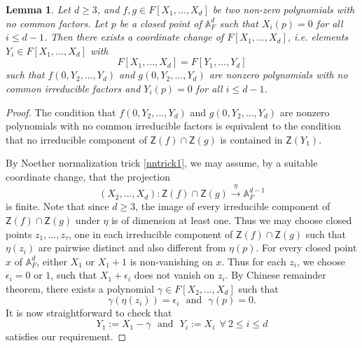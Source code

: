 \documentclass[10pt]{amsart}
\theoremstyle{plain}
\newtheorem{lemma}[thm]{Lemma}
\theoremstyle{definition}
\newcommand{\intersection}{\cap}
\newcommand{\A}{{\mathbb A}}
\let\syn\mathsf
\begin{document}
\begin{lemma}\label{fgcommon} Let $d\geq 3$, and $f,g\in F[X_1,...,X_d]$ be two non-zero polynomials with no common factors. Let $p$ be a closed point of $\A^d_F$ such that $X_i(p)=0$ for all $i\leq d-1$. Then there exists a coordinate change of $F[X_1,...,X_d]$, i.e. elements $Y_i\in F[X_1,...,X_d]$ with $$ F[X_1,...,X_d] = F[Y_1,...,Y_d]$$ 
such that  $f(0,Y_2,...,Y_d)$ and $g(0,Y_2,...,Y_d)$ are nonzero polynomials with no common irreducible factors and $Y_i(p)=0$ for all $i\leq d-1$.  
\end{lemma}
\begin{proof}
The condition that $f(0,Y_2,...,Y_d)$ and $g(0,Y_2,...,Y_d)$ are nonzero polynomials with no common irreducible factors is equivalent to the condition that no irreducible component of $\syn{Z}(f)\intersection \syn{Z}(g)$ is contained in $\syn{Z}(Y_1)$. 

By Noether normalization trick \ref{nntrick1}, we may assume, by a suitable coordinate change, that the projection 
$$ (X_2,...,X_{d}) : \syn{Z}(f)\intersection \syn{Z}(g) \xrightarrow{\eta} \A^{d-1}_F$$ is finite. 
Note that since $d\geq 3$, the image of every irreducible component of $\syn{Z}(f)\intersection \syn{Z}(g)$ under $\eta$ is of dimension at least one. Thus we may choose closed points $z_1,...,z_\tau$, one in each irreducible component of $\syn{Z}(f)\intersection \syn{Z}(g)$ such that $\eta(z_i)$ are pairwise distinct and also different from $\eta(p)$. For every closed point $x$ of $\A^d_F$, either $X_1$ or $X_1+1$ is non-vanishing on $x$. Thus for each $z_i$, we choose $\epsilon_i=0$ or $1$, such that $X_1+\epsilon_i$ does not vanish on $z_i$. By Chinese remainder theorem, there exists a polynomial $\gamma\in F[X_2,...,X_{d}]$ such that 
$$ \gamma(\eta(z_i))= \epsilon_i \ \ \ \text{and} \ \ \ \gamma(p)=0.$$
It is now straightforward to check that $$Y_1:= X_1-\gamma \ \ \ \text{and} \ \ \ Y_i:=X_i \ \ \forall \ 2\leq i\leq d$$
satisfies our requirement. 
\end{proof}
\end{document}
